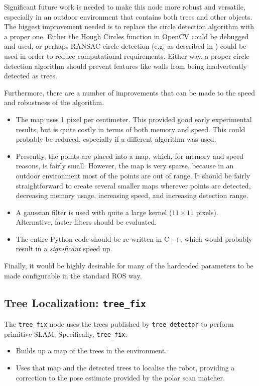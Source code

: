 \documentclass[12pt,oneside,a4paper,draft]{book}
\begin{document}
Significant future work is needed to make this node more robust and
versatile, especially in an outdoor environment that contains both
trees and other objects. The biggest improvement needed is to replace
the circle detection algorithm with a proper one. Either the Hough
Circles function in OpenCV could be debugged and used, or perhaps
RANSAC circle detection (e.g. as described in \cite{ransac}) could be
used in order to reduce computational requirements. Either way, a
proper circle detection algorithm should prevent features like walls
from being inadvertently detected as trees.

Furthermore, there are a number of improvements that can be made to
the speed and robustness of the algorithm.
\begin{itemize}
\item The map uses 1 pixel per centimeter. This provided good early
  experimental results, but is quite costly in terms of both memory
  and speed. This could probably be reduced, especially if a different
  algorithm was used.
\item Presently, the points are placed into a map, which, for memory
  and speed reasons, is fairly small. However, the map is very sparse,
  because in an outdoor environment most of the points are out of range.
  It should be fairly straightforward to create several smaller maps
  wherever points are detected, decreasing memory usage, increasing
  speed, and increasing detection range.
\item A gaussian filter is used with quite a large kernel ($11 \times
  11$ pixels). Alternative, faster filters should be evaluated.
\item The entire Python code should be re-written in C++, which would
  probably result in a \emph{significant} speed up.
\end{itemize}

Finally, it would be highly desirable for many of the hardcoded
parameters to be made configurable in the standard ROS way.
\newpage
\subsection{Tree Localization: \texttt{tree\_fix}}
\label{sec:tree_fix}

The \texttt{tree\_fix} node uses the trees published by
\texttt{tree\_detector} to perform primitive SLAM. Specifically, \texttt{tree\_fix}:
\begin{itemize}
\item Builds up a map of the trees in the environment.
\item Uses that map and the detected trees to localise the robot,
  providing a correction to the pose estimate provided by the polar
  scan matcher.
\end{itemize}
\end{document}
